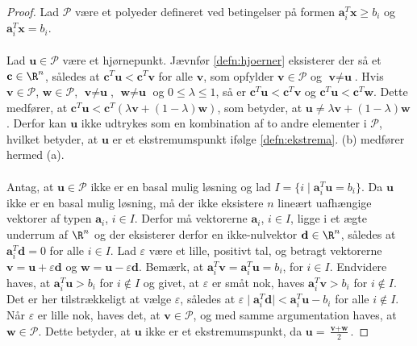 \begin{proof}
Lad $\mathcal{P}$ være et polyeder defineret ved betingelser på formen $\textbf{a}_i^T\textbf{x} \geq b_i$ og $\textbf{a}_i^T\textbf{x} = b_i$.\\\\
%
Lad $\textbf{u} \in \mathcal{P}$ være et hjørnepunkt. Jævnfør \ref{defn:hjoerner} eksisterer der så et $\textbf{c} \in \R^n$, således at $\textbf{c}^T\textbf{u} < \textbf{c}^T\textbf{v}$ for alle $\textbf{v}$, som opfylder $\textbf{v} \in \mathcal{P}$ og $\textbf{v} \neq \textbf{u}$.
Hvis $\textbf{v} \in \mathcal{P}$, $\textbf{w} \in \mathcal{P}$, $\textbf{v} \neq \textbf{u}$, $\textbf{w} \neq \textbf{u}$ og $0 \leq \lambda \leq 1$, så er $\textbf{c}^T\textbf{u} < \textbf{c}^T\textbf{v}$ og $\textbf{c}^T\textbf{u} < \textbf{c}^T\textbf{w}$.
Dette medfører, at $\textbf{c}^T\textbf{u} < \textbf{c}^T(\lambda \textbf{v} + (1-\lambda)\textbf{w})$, som betyder, at $\textbf{u} \neq \lambda \textbf{v} + (1 - \lambda)\textbf{w}$.
Derfor kan $\textbf{u}$ ikke udtrykes som en kombination af to andre elementer i $\mathcal{P}$, hvilket betyder, at $\textbf{u}$ er et ekstremumspunkt ifølge \ref{defn:ekstrema}.
(b) medfører hermed (a).
\\\\
%
Antag, at $\textbf{u} \in \mathcal{P}$ ikke er en basal mulig løsning og lad $I = \{ i \mid \textbf{a}_i^T \textbf{u} = b_i\}$.
Da $\textbf{u}$ ikke er en basal mulig løsning, må der ikke eksistere $n$ lineært uafhængige vektorer af typen $\textbf{a}_i$, $i \in I$.
Derfor må vektorerne $\textbf{a}_i$, $i \in I$, ligge i et ægte underrum af $\R^n$ og der eksisterer derfor en ikke-nulvektor $\textbf{d} \in \R^n$, således at $\textbf{a}_i^T\textbf{d} = 0$ for alle $i \in I$.
Lad $\varepsilon$ være et lille, positivt tal, og betragt vektorerne $\textbf{v} = \textbf{u} + \varepsilon\textbf{d}$ og $\textbf{w} = \textbf{u} - \varepsilon\textbf{d}$.
Bemærk, at $\textbf{a}_i^T \textbf{v} = \textbf{a}_i^T \textbf{u} = b_i$, for $i \in I$.
Endvidere haves, at $\textbf{a}_i^T \textbf{u} > b_i$ for $i \notin I$ og givet, at $\varepsilon$ er småt nok, haves $\textbf{a}_i^T \textbf{v} > b_i$ for $i \notin I$.
Det er her tilstrækkeligt at vælge $\varepsilon$, således at $\varepsilon \mid \textbf{a}_i^T\textbf{d} \mid < \textbf{a}_i^T\textbf{u} - b_i$ for alle $i \notin I$.
Når $\varepsilon$ er lille nok, haves det, at $\textbf{v} \in \mathcal{P}$, og med samme argumentation haves, at $\textbf{w} \in \mathcal{P}$.
Dette betyder, at $\textbf{u}$ ikke er et ekstremumspunkt, da $\textbf{u} = \frac{\textbf{v} + \textbf{w}}{2}$.

\end{proof}
